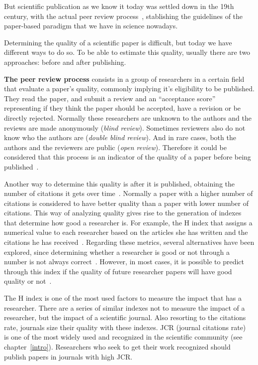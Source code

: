 But scientific publication as we know it today was settled down in the 19th
century, with the actual peer review process~\cite{burnham1990evolution},
stablishing the guidelines of the paper-based paradigm that we have in science
nowadays.

Determining the quality of a scientific paper is difficult, but today we have
different ways to do so. To be able to estimate this quality, usually there are
two approaches: before and after publishing.

\textbf{The peer review process} consists in a group of researchers in a certain
field that evaluate a paper's quality, commonly implying it's eligibility to be
published. They read the paper, and submit a review and an ``acceptance score''
representing if they think the paper should be accepted, have a revision or be
directly rejected. Normally these researchers are unknown to the authors and the
reviews are made anonymously (\emph{blind review}). Sometimes reviewers also do
not know who the authors are (\emph{double blind review}). And in rare cases,
both the authors and the reviewers are public (\emph{open review}). Therefore it
could be considered that this process is an indicator of the quality of a paper
before being published~\cite{szklo2006quality}.

Another way to determine this quality is after it is published, obtaining the
number of citations it gets over time~\cite{redner1998popular}. Normally a paper
with a higher number of citations is considered to have better quality than a
paper with lower number of citations. This way of analyzing quality gives rise
to the generation of indexes that determine how good a researcher is. For
example, the H index that assigns a numerical value to each researcher based on
the articles she has written and the citations he has
received~\cite{bornmann2007we}. Regarding these metrics, several alternatives
have been explored, since determining whether a researcher is good or not
through a number is not always correct~\cite{bornmann2008there}. However, in
most cases, it is possible to predict through this index if the quality of
future researcher papers will have good quality or not~\cite{hirsch2007does}.

The H index is one of the most used factors to measure the impact that has a
researcher. There are a series of similar indexes not to measure the impact of a
researcher, but the impact of a scientific journal. Also resorting to the
citations rate, journals size their quality with these indexes. JCR (journal
citations rate)~\cite{doi:10.1001/jama.295.1.90} is one of the most widely used
and recognized in the scientific community (see chapter~\ref{intro}).
Researchers who seek to get their work recognized should publish papers in
journals with high JCR.

